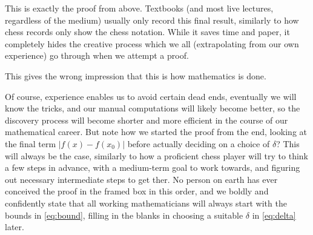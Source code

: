 \documentclass[11pt]{article}
\theoremstyle{plain}
\theoremstyle{definition}
\theoremstyle{remark}
\numberwithin{equation}{section}
\begin{document}
\vspace{1em}This is exactly the proof from above. Textbooks (and most live lectures, regardless of the medium) usually only record this final result, similarly to how chess records only show the chess notation. While it saves time and paper, it completely hides the creative process which we all (extrapolating from our own experience) go through when we attempt a proof. 

This gives the wrong impression that this is how mathematics is done.

Of course, experience enables us to avoid certain dead ends, eventually we will know the tricks, and our manual computations will likely become better, so the discovery process will become shorter and more efficient in the course of our mathematical career. But note how we started the proof from the end, looking at the final term $|f(x)-f(x_0)|$ before actually deciding on a choice of $\delta$? This will always be the case, similarly to how a proficient chess player will try to think a few steps in advance, with a medium-term goal to work towards, and figuring out necessary intermediate steps to get ther. No person on earth has ever conceived the proof in the framed box in this order, and we boldly and confidently state that all working mathematicians will always start with the bounds in \eqref{eq:bound}, filling in the blanks in choosing a suitable $\delta$ in \eqref{eq:delta} later. 
\end{document}

